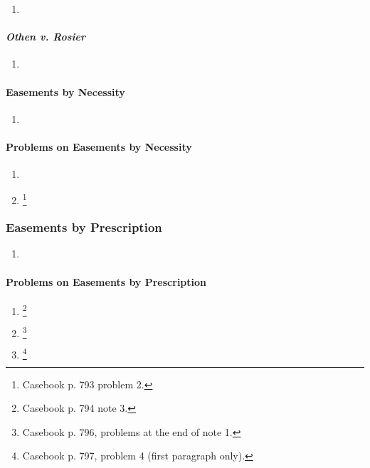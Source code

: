 \begin{enumerate}
    \item %
\end{enumerate}

\paragraph{\emph{Othen v. Rosier}}

\begin{enumerate}
    \item %
\end{enumerate}

\paragraph{Easements by Necessity}

\begin{enumerate}
    \item %
\end{enumerate}

\paragraph{Problems on Easements by Necessity}

\begin{enumerate}
    \item %
    \item \footnote{Casebook p. 793 problem 2.}
\end{enumerate}

\subsubsection{Easements by Prescription}

\begin{enumerate}
    \item %
\end{enumerate}

\paragraph{Problems on Easements by Prescription}

\begin{enumerate}
    \item \footnote{Casebook p. 794 note 3.}
    \item \footnote{Casebook p. 796, problems at the end of note 1.}
    \item \footnote{Casebook p. 797, problem 4 (first paragraph only).}
\end{enumerate}

